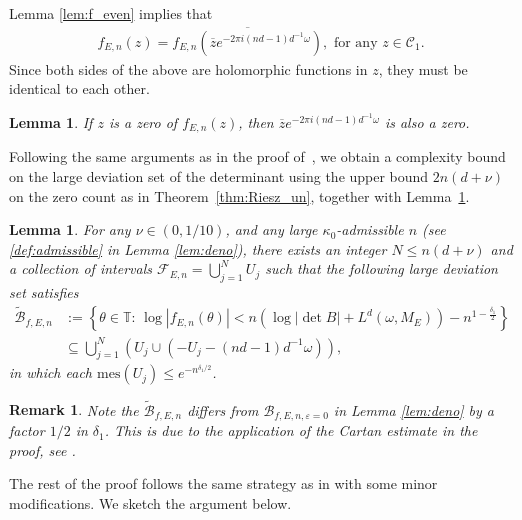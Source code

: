 \documentclass[11pt]{amsart}
\newtheorem{lemma}[theorem]{Lemma}
\newtheorem{remark}[theorem]{Remark}
\newcommand{\T}{\mathbb T}
\begin{document}
Lemma \ref{lem:f_even} implies that
\begin{align}
    f_{E,n}(z)=\overline{f_{E,n}(\overline{z} e^{-2\pi i(nd-1)d^{-1}\omega})}, \text{ for any } z\in \mathcal{C}_1.
\end{align}
Since both sides of the above are holomorphic functions in $z$, they must be identical to each other. 

\begin{lemma}\label{lem:even_zero}
If $z$ is a zero of $f_{E,n}(z)$, then $\overline{z}e^{-2\pi i(nd-1)d^{-1}\omega}$ is also a zero.
\end{lemma}

Following the same arguments as in the proof of~\cite[Lemma 6.2]{HS2}, we obtain a complexity bound on the large deviation set of the determinant using the upper bound $2n(d+\nu)$ on the zero count  as in Theorem~\ref{thm:Riesz_un}, together with Lemma~\ref{lem:even_zero}. 

\begin{lemma}\label{lem:complexity_1}
For any $\nu\in (0,1/10)$, and any large $\kappa_0$-admissible $n$ (see \eqref{def:admissible} in Lemma \ref{lem:deno}), there exists an integer $N\leq n(d+\nu)$ and a collection of intervals $\mathcal{F}_{E,n}=\bigcup_{j=1}^N U_j$ such that
the following large deviation set satisfies 
\begin{align}\label{def:wt_B_fEn}
\widetilde{\mathcal{B}}_{f,E,n}&:=\left\{\theta\in \T:\, \log |f_{E,n}(\theta)|<n(\log |\det B|+L^d(\omega,M_E))-n^{1-\frac{\delta_1}{2}}\right\}\\
&\subseteq \bigcup_{j=1}^N (U_j\cup (-U_j-(nd-1)d^{-1}\omega)),
\end{align}
in which each $\mathrm{mes}(U_j)\leq e^{-n^{\delta_1/2}}$.
\end{lemma}
\begin{remark}
    Note the $\widetilde{\mathcal{B}}_{f,E,n}$ differs from $\mathcal{B}_{f,E,n,\varepsilon=0}$ in Lemma \ref{lem:deno} by a factor $1/2$ in $\delta_1$. This is due to the application of the Cartan estimate in the proof, see \cite[Lemma 6.2]{HS2}.
\end{remark}

The rest of the proof follows the same strategy as in \cite{HS2} with some minor modifications. We sketch the argument below.
\end{document}
